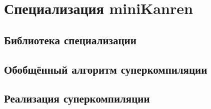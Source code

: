 \section{Специализация miniKanren}
\label{sec:scmk}


\subsection{Библиотека специализации}



\subsection{Обобщённый алгоритм суперкомпиляции}



\subsection{Реализация суперкомпиляции}


